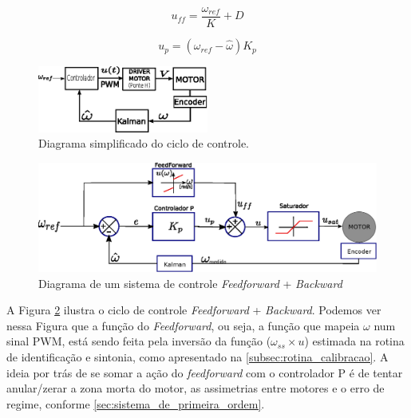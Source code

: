 \begin{equation}
    u_{ff} = \frac{\omega_{ref}}{K} + D
    \label{eq:feedforward}
\end{equation}

\begin{equation}
    u_{p} = (\omega_{ref} - \hat{\omega})K_p
    \label{eq:proporcional}
\end{equation}

\begin{figure}[H]
    \centering
    \includegraphics[width=0.5\textwidth]{figuras/ilustracoes/sistema_de_controle_embarcado.eps}
    \caption{Diagrama simplificado do ciclo de controle.}
    \label{fig:diagrama_de_controle_simplificado}
\end{figure}

\begin{figure}[H]
    \centering
    \includegraphics[width=\textwidth]{figuras/ilustracoes/sistema_de_controle_completo.eps}
    \caption{Diagrama de um sistema de controle \textit{Feedforward} + \textit{Backward}}
    \label{fig:diagrama_sistema_de_controle_feedforward_backward}
\end{figure}

A Figura \ref{fig:diagrama_sistema_de_controle_feedforward_backward} ilustra o ciclo de controle \emph{Feedforward} + \emph{Backward}. Podemos ver nessa Figura que a função do \emph{Feedforward}, ou seja, a função que mapeia $\omega$ num sinal PWM, está sendo feita pela inversão da função ($\omega_{ss} \times u$) estimada na rotina de identificação e sintonia, como apresentado na \autoref{subsec:rotina_calibracao}. A ideia por trás de se somar a ação do \emph{feedforward} com o controlador P é de tentar anular/zerar a zona morta do motor, as assimetrias entre motores e o erro de regime, conforme \autoref{sec:sistema_de_primeira_ordem}.